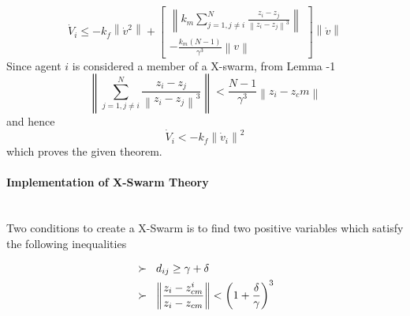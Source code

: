 \documentclass[twoside]{article}
\newcommand{\norm}[1]{\left\lVert#1\right\rVert}
\begin{document}
			\begin{equation}
\dot{V}_i \leq -k_f \norm{\dot{v}^2} + \begin{bmatrix}
\norm{k_m \sum_{j=1, j \neq i}^{N} \frac{z_i - z_j}{\norm{z_i - z_j}^3}} \\
- \frac{k_m(N-1)}{\gamma ^3} \norm{v}
\end{bmatrix} \norm{\dot{v}}
			\end{equation}
			Since agent $i$ is considered a member of a X-swarm, from Lemma -1
			\begin{equation}
\norm{ \sum_{j=1, j \neq i}^{N} \frac{z_i - z_j}{\norm{z_i - z_j}^3}} < \frac{N-1}{\gamma^3} \norm{z_i - z_cm}
			\end{equation}
			and hence
			\begin{equation}
\dot{V}_i < -k_f \norm{\dot{v}_i} ^2
			\end{equation}
			which proves the given theorem.  \newline

	\paragraph{Implementation of X-Swarm Theory}\hspace{0pt} \\		

Two conditions to create a X-Swarm is to find two positive variables which satisfy the following inequalities

		\begin{align*}
		&\succ\hspace{0.2cm}  d_{ij} \geq \gamma + \delta \\
		&\succ \hspace{0.2cm}   \norm{\frac{z_i - z_{cm}^i}{z_i - z_{cm}}} < \left(1+\frac{\delta}{\gamma}\right)^3
		\end{align*}
		
\end{document}
